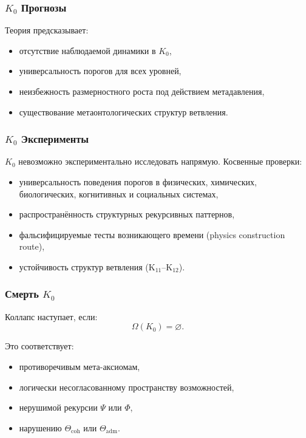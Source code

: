 \subsubsection{\texorpdfstring{$K_0$}{K_0} Прогнозы}

Теория предсказывает:
\begin{itemize}
    \item отсутствие наблюдаемой динамики в $K_0$,
    \item универсальность порогов для всех уровней,
    \item неизбежность размерностного роста под действием метадавления,
    \item существование метаонтологических структур ветвления.
\end{itemize}

\subsubsection{\texorpdfstring{$K_0$}{K_0} Эксперименты}

$K_0$ невозможно экспериментально исследовать напрямую.
Косвенные проверки:
\begin{itemize}
    \item универсальность поведения порогов в физических,
          химических, биологических, когнитивных и социальных системах,
    \item распространённость структурных рекурсивных паттернов,
    \item фальсифицируемые тесты возникающего времени (physics construction route),
    \item устойчивость структур ветвления (K$_{11}$–K$_{12}$).
\end{itemize}

\subsubsection{Смерть \texorpdfstring{$K_0$}{K_0}}

Коллапс наступает, если:
\[
\Omega(K_0) = \varnothing.
\]

Это соответствует:
\begin{itemize}
    \item противоречивым мета-аксиомам,
    \item логически несогласованному пространству возможностей,
    \item нерушимой рекурсии $\Psi$ или $\Phi$,
    \item нарушению $\Theta_{\mathrm{coh}}$ или $\Theta_{\mathrm{adm}}$.
\end{itemize}

